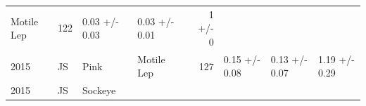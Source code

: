 \documentclass[fleqn,10pt]{wlpeerj} %
\begin{document}
\begin{longtable}[]{@{}llllrlll@{}}
\begin{minipage}[t]{0.11\columnwidth}
Motile Lep\strut
\end{minipage} & \begin{minipage}[t]{0.04\columnwidth}\raggedleft\strut
122\strut
\end{minipage} & \begin{minipage}[t]{0.14\columnwidth}\raggedright\strut
0.03 +/- 0.03\strut
\end{minipage} & \begin{minipage}[t]{0.14\columnwidth}\raggedright\strut
0.03 +/- 0.01\strut
\end{minipage} & \begin{minipage}[t]{0.14\columnwidth}\raggedright\strut
1 +/- 0\strut
\end{minipage}\tabularnewline
\begin{minipage}[t]{0.09\columnwidth}\raggedright\strut
2015\strut
\end{minipage} & \begin{minipage}[t]{0.06\columnwidth}\raggedright\strut
JS\strut
\end{minipage} & \begin{minipage}[t]{0.06\columnwidth}\raggedright\strut
Pink\strut
\end{minipage} & \begin{minipage}[t]{0.11\columnwidth}\raggedright\strut
Motile Lep\strut
\end{minipage} & \begin{minipage}[t]{0.04\columnwidth}\raggedleft\strut
127\strut
\end{minipage} & \begin{minipage}[t]{0.14\columnwidth}\raggedright\strut
0.15 +/- 0.08\strut
\end{minipage} & \begin{minipage}[t]{0.14\columnwidth}\raggedright\strut
0.13 +/- 0.07\strut
\end{minipage} & \begin{minipage}[t]{0.14\columnwidth}\raggedright\strut
1.19 +/- 0.29\strut
\end{minipage}\tabularnewline
\begin{minipage}[t]{0.09\columnwidth}\raggedright\strut
2015\strut
\end{minipage} & \begin{minipage}[t]{0.06\columnwidth}\raggedright\strut
JS\strut
\end{minipage} & \begin{minipage}[t]{0.06\columnwidth}\raggedright\strut
Sockeye\strut
\end{minipage} & \begin{minipage}[t]{0.11\columnwidth}\raggedright\strut

\end{minipage}
\end{longtable}
\end{document}
